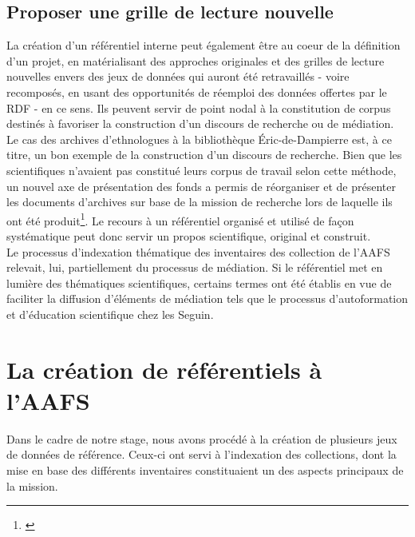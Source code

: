 \documentclass[a4paper,12pt,twoside]{book}
\begin{document}
\subsection{Proposer une grille de lecture nouvelle}\label{2-grille-lecture}

La création d'un référentiel interne peut également être au coeur de la définition d'un projet, en matérialisant des approches originales et des grilles de lecture nouvelles envers des jeux de données qui auront été retravaillés - voire recomposés, en usant des opportunités de réemploi des données offertes par le RDF - en ce sens. Ils peuvent servir de point nodal à la constitution de corpus destinés à favoriser la construction d'un discours de recherche ou de médiation.\\

Le cas des archives d'ethnologues à la bibliothèque Éric-de-Dampierre est, à ce titre, un bon exemple de la construction d'un discours de recherche. Bien que les scientifiques n'avaient pas constitué leurs corpus de travail selon cette méthode, un nouvel axe de présentation des fonds a permis de réorganiser et de présenter les documents d'archives sur base de la mission de recherche lors de laquelle ils ont été produit\footnote{\cite[p.~18]{carbonnelArchivesSciencesHumaines2017}}. Le recours à un référentiel organisé et utilisé de façon systématique peut donc servir un propos scientifique, original et construit.\\

Le processus d'indexation thématique des inventaires des collection de l'AAFS relevait, lui, partiellement du processus de médiation. Si le référentiel met en lumière des thématiques scientifiques, certains termes ont été établis en vue de faciliter la diffusion d'éléments de médiation tels que le processus d'autoformation et d'éducation scientifique chez les Seguin. 



\section{La création de référentiels à l'AAFS}
Dans le cadre de notre stage, nous avons procédé à la création de plusieurs jeux de données de référence. Ceux-ci ont servi à l'indexation des collections, dont la mise en base des différents inventaires constituaient un des aspects principaux de la mission.\\
\end{document}
